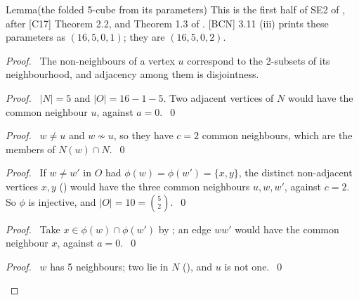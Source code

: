 \begin{namedresult}{Lemma}{(the folded 5-cube from its parameters)}\label{lem:414-foldiso}
 This is the first half of SE2 of , after [C17] Theorem 2.2, and
 Theorem 1.3 of . [BCN] 3.11 (iii) prints these parameters as
 $(16,5,0,1)$; they are $(16,5,0,2)$.
\end{namedresult}
\begin{proof}
 \pfsketch\ The non-neighbours of a vertex $u$ correspond to the 2-subsets of its
 neighbourhood, and adjacency among them is disjointness.
 \begin{proof}\pf\ $|N|=5$ and $|O|=16-1-5$. Two adjacent vertices of $N$ would have the common
  neighbour $u$, against $a=0$.~\qed\end{proof}
 \begin{proof}\pf\ $w\ne u$ and $w\not\sim u$, so they have $c=2$ common neighbours, which are
  the members of $N(w)\cap N$.~\qed\end{proof}
 \begin{proof}\pf\ If $w\ne w'$ in $O$ had $\phi(w)=\phi(w')=\{x,y\}$, the distinct non-adjacent
  vertices $x,y$ () would have the three common neighbours $u,w,w'$,
  against $c=2$. So $\phi$ is injective, and $|O|=10=\binom52$.~\qed\end{proof}
 \begin{proof}\pf\ Take $x\in\phi(w)\cap\phi(w')$ by ; an edge $ww'$ would have the common
  neighbour $x$, against $a=0$.~\qed\end{proof}
 \begin{proof}\pf\ $w$ has 5 neighbours; two lie in $N$ (), and $u$ is not
  one.~\qed\end{proof}

\end{proof}
